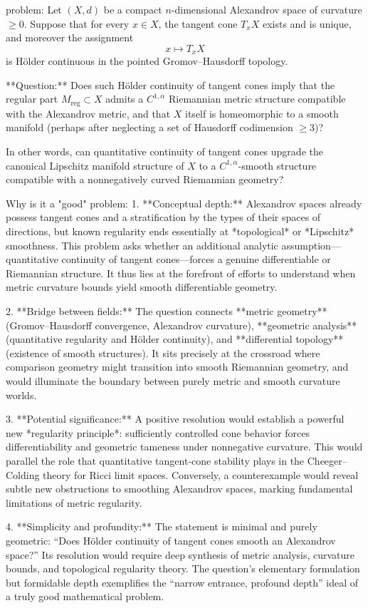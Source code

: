 problem:  
Let \( (X,d) \) be a compact \(n\)-dimensional Alexandrov space of curvature \(\ge 0\). Suppose that for every \(x \in X\), the tangent cone \(T_x X\) exists and is unique, and moreover the assignment  
\[
x \mapsto T_x X
\]
is Hölder continuous in the pointed Gromov–Hausdorff topology.  

**Question:**  
Does such Hölder continuity of tangent cones imply that the regular part \(M_{\mathrm{reg}}\subset X\) admits a \(C^{1,\alpha}\) Riemannian metric structure compatible with the Alexandrov metric, and that \(X\) itself is homeomorphic to a smooth manifold (perhaps after neglecting a set of Hausdorff codimension \(\ge 3\))?  

In other words, can quantitative continuity of tangent cones upgrade the canonical Lipschitz manifold structure of \(X\) to a \(C^{1,\alpha}\)-smooth structure compatible with a nonnegatively curved Riemannian geometry?

Why is it a "good" problem:  
1. **Conceptual depth:**  
   Alexandrov spaces already possess tangent cones and a stratification by the types of their spaces of directions, but known regularity ends essentially at *topological* or *Lipschitz* smoothness. This problem asks whether an additional analytic assumption—quantitative continuity of tangent cones—forces a genuine differentiable or Riemannian structure. It thus lies at the forefront of efforts to understand when metric curvature bounds yield smooth differentiable geometry.

2. **Bridge between fields:**  
   The question connects **metric geometry** (Gromov–Hausdorff convergence, Alexandrov curvature), **geometric analysis** (quantitative regularity and Hölder continuity), and **differential topology** (existence of smooth structures). It sits precisely at the crossroad where comparison geometry might transition into smooth Riemannian geometry, and would illuminate the boundary between purely metric and smooth curvature worlds.

3. **Potential significance:**  
   A positive resolution would establish a powerful new *regularity principle*: sufficiently controlled cone behavior forces differentiability and geometric tameness under nonnegative curvature. This would parallel the role that quantitative tangent-cone stability plays in the Cheeger–Colding theory for Ricci limit spaces. Conversely, a counterexample would reveal subtle new obstructions to smoothing Alexandrov spaces, marking fundamental limitations of metric regularity.

4. **Simplicity and profundity:**  
   The statement is minimal and purely geometric: “Does Hölder continuity of tangent cones smooth an Alexandrov space?” Its resolution would require deep synthesis of metric analysis, curvature bounds, and topological regularity theory. The question’s elementary formulation but formidable depth exemplifies the “narrow entrance, profound depth” ideal of a truly good mathematical problem.